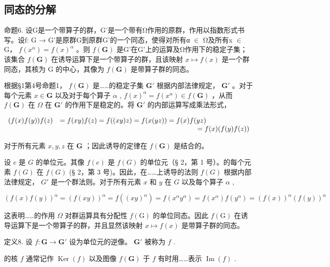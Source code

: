 \subsection{同态的分解}

命题6. 设G是一个带算子的群，G'是一个带有Ω作用的原群，作用以指数形式书写。设f: G → G'是原群G到原群G'的一个同态，使得对所有α \ensuremath{\in} Ω及所有x \ensuremath{\in} G， \(f(x^{\alpha}) = f(x)^{\alpha}\) 。则 \(f(\mathbf{G})\) 是G'在G'上的运算及Ω作用下的稳定子集；该集合 \(f(\mathbf{G})\) 在诱导运算下是一个带算子的群，且该映射 \(x \mapsto f(x)\) 是一个群同态，其核为 G 的中心，其像为 \(f(\mathbf{G})\) 是带算子群的同态。

根据§1第4号命题1， \(f(\mathbf{G})\) 是……的稳定子集 \(\mathbf{G}'\) 根据内部法律规定， \(\mathbf{G}'\) 。对于每个元素 \(x \in \mathbf{G}\) 以及对于每个算子 \(\alpha\) , \(f(x)^{\alpha} = f(x^{\alpha}) \in f(\mathbf{G})\) ，从而 \(f(\mathbf{G})\) 在 \(\Omega\) 在 \(\mathbf{G}'\) 的作用下是稳定的。将 \(\mathbf{G}'\) 的内部运算写成乘法形式，

\[
\begin{array}{r l} (f (x) f (y)) f (z) & = f (x y) f (z) = f ((x y) z) = f (x (y z)) = f (x) f (y z) \\ & \qquad \qquad \qquad \qquad \qquad \qquad \qquad \qquad \qquad \qquad = f (x) (f (y) f (z)) \end{array}
\]

对于所有元素 \(x, y, z\) 在 \(\mathbf{G}\) ；因此诱导的定律在 \(f(\mathbf{G})\) 是结合的。

设 \(e\) 是 \(G\) 的单位元。其像 \(f(e)\) 是 \(f(G)\) 的单位元（§ 2，第 1 号）。的每个元素 \(f(G)\) 在 \(f(G)\) (§ 2，第 3 号)。因此，在……上诱导的法则 \(f(G)\) 根据内部法律规定， \(G'\) 是一个群法则。对于所有元素 \(x\) 和 \(y\) 在 \(G\) 以及每个算子 \(\alpha\) ,

\[
(f (x) f (y)) ^ {\alpha} = (f (x y)) ^ {\alpha} = f ((x y) ^ {\alpha}) = f \left(x ^ {\alpha} y ^ {\alpha}\right) = f \left(x ^ {\alpha}\right) f \left(y ^ {\alpha}\right) = (f (x)) ^ {\alpha} (f (y)) ^ {\alpha}
\]

这表明……的作用 \(\Omega\) 对群运算具有分配性 \(f(\mathrm{G})\) 的单位同态。因此 \(f(\mathrm{G})\) 在诱导运算下是一个带算子的群，并且显然该映射 \(x \mapsto f(x)\) 是带算子群的同态。

定义8. 设 \(f: \mathbf{G} \to \mathbf{G}'\) 设为单位元的逆像。 \(\mathbf{G}'\) 被称为 \(f\) .

的核 \(f\) 通常记作 \(\operatorname{Ker}(f)\) 以及图像 \(f(\mathbf{G})\) 于 \(f\) 有时用……表示 \(\operatorname{Im}(f)\) .

